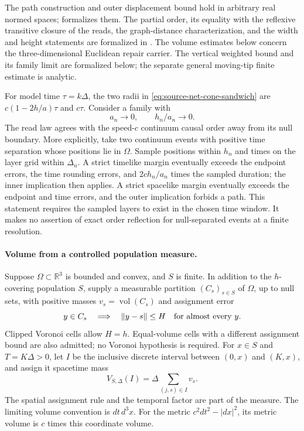 The path construction and outer displacement bound hold in arbitrary real
normed spaces;  formalizes them.
The partial order, its equality with the reflexive transitive closure of the
reads, the graph-distance characterization, and the width and height
statements are formalized in .
The volume estimates below concern the three-dimensional Euclidean repair
carrier. The vertical weighted bound and its family limit are formalized
below; the separate general moving-tip finite estimate is analytic.

For model time $\tau=k\Delta$, the two radii in
\eqref{eq:source-net-cone-sandwich} are
$c(1-2h/a)\tau$ and $c\tau$. Consider a family with
\begin{equation}
 a_n\longrightarrow0,\qquad h_n/a_n\longrightarrow0.
 \label{eq:source-net-causal-refinement}
\end{equation}
The read law agrees with the speed-$c$ continuum causal order away from its
null boundary. More explicitly, take two continuum events with positive
time separation whose positions lie in $\Omega$. Sample positions within
$h_n$ and times on the layer grid within $\Delta_n$. A strict timelike
margin eventually exceeds the endpoint errors, the time rounding errors,
and $2ch_n/a_n$ times the sampled duration; the inner implication then
applies. A strict spacelike margin eventually exceeds the endpoint and time
errors, and the outer implication forbids a path. This statement requires
the sampled layers to exist in the chosen time window. It makes no assertion
of exact order reflection for null-separated events at a finite resolution.

\paragraph{Volume from a controlled population measure.}
Suppose $\Omega\subset\mathbb R^3$ is bounded and convex, and $S$ is finite.
In addition to the $h$-covering population $S$, supply a measurable partition
$(C_s)_{s\in S}$ of $\Omega$, up to null sets, with positive masses
$v_s=\operatorname{vol}(C_s)$ and assignment error
\begin{equation}
 y\in C_s\quad\Longrightarrow\quad\|y-s\|\leq H
 \quad\hbox{for almost every }y.
 \label{eq:source-net-cell-assignment}
\end{equation}
Clipped Voronoi cells allow $H=h$. Equal-volume cells with a different
assignment bound are also admitted; no Voronoi hypothesis is required.
For $x\in S$ and $T=K\Delta>0$, let $I$ be the inclusive discrete interval
between $(0,x)$ and $(K,x)$, and assign it spacetime mass
\[
 V_{S,\Delta}(I)=\Delta\sum_{(j,s)\in I}v_s.
\]
The spatial assignment rule and the temporal factor are part of the measure.
The limiting volume convention is $dt\,d^3x$. For the metric
$c^2dt^2-|dx|^2$, its metric volume is $c$ times this coordinate volume.

